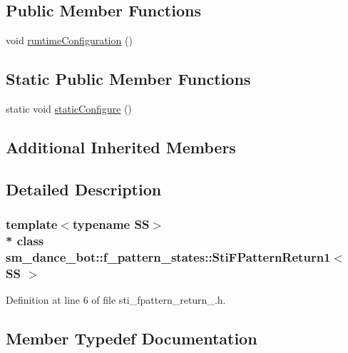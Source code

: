 \subsection*{Public Member Functions}
\begin{DoxyCompactItemize}
\item 
void \hyperlink{structsm__dance__bot_1_1f__pattern__states_1_1StiFPatternReturn1_a2403e4f5c2e8b8858a9de8945d7eee48}{runtime\+Configuration} ()
\end{DoxyCompactItemize}
\subsection*{Static Public Member Functions}
\begin{DoxyCompactItemize}
\item 
static void \hyperlink{structsm__dance__bot_1_1f__pattern__states_1_1StiFPatternReturn1_a8dc2319ebc743b31189067897a9ace78}{static\+Configure} ()
\end{DoxyCompactItemize}
\subsection*{Additional Inherited Members}


\subsection{Detailed Description}
\subsubsection*{template$<$typename SS$>$\\*
class sm\+\_\+dance\+\_\+bot\+::f\+\_\+pattern\+\_\+states\+::\+Sti\+F\+Pattern\+Return1$<$ S\+S $>$}



Definition at line 6 of file sti\+\_\+fpattern\+\_\+return\+\_.\+h.



\subsection{Member Typedef Documentation}
